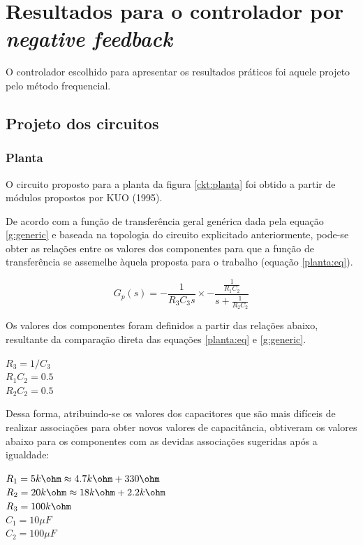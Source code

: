 \section{Resultados para o controlador por \textit{negative feedback}}

O controlador escolhido para apresentar os resultados práticos foi aquele projeto pelo método frequencial. 

\subsection{Projeto dos circuitos}

\subsubsection{Planta}

O circuito proposto para a planta da figura \ref{ckt:planta} foi obtido a partir de módulos propostos por KUO (1995).



De acordo com a função de transferência geral genérica dada pela equação \ref{g:generic} e baseada na topologia do circuito explicitado anteriormente, pode-se obter as relações entre os valores dos componentes para que a função de transferência se assemelhe àquela proposta para o trabalho (equação \ref{planta:eq}).

\begin{equation} \label{g:generic}
    G_p(s) = -\frac{1}{R_3C_3s}\times-\frac{\frac{1}{R_1C_2}}{s+\frac{1}{R_2C_2}}
\end{equation}

Os valores dos componentes foram definidos a partir das relações abaixo, resultante da comparação direta das equações \ref{planta:eq} e \ref{g:generic}.

\begin{center}
    $R_3 = 1/C_3$ \vspace{5pt}\\
    $R_1C_2=0.5$ \vspace{5pt}\\
    $R_2C_2=0.5$ 
\end{center}

Dessa forma, atribuindo-se os valores dos capacitores que são mais difíceis de realizar associações para obter novos valores de capacitância, obtiveram os valores abaixo para os componentes com as devidas associações sugeridas após a igualdade:

\begin{center}
    $R_1 = 5k\ohm \approx 4.7k\ohm + 330\ohm$ \vspace{5pt}\\
    $R_2 = 20k\ohm \approx 18k\ohm + 2.2k\ohm$ \vspace{5pt}\\
    $R_3 = 100k \ohm$ \vspace{5pt}\\
    $C_1 = 10 \mu F$ \vspace{5pt}\\
    $C_2 = 100 \mu F$ 
\end{center}

